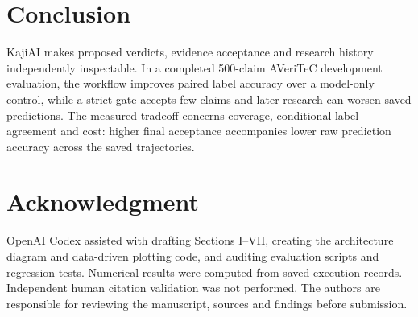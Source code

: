 \documentclass[conference]{IEEEtran}
\begin{document}
\section{Conclusion}
KajiAI makes proposed verdicts, evidence acceptance and research history independently inspectable. In a completed 500-claim AVeriTeC development evaluation, the workflow improves paired label accuracy over a model-only control, while a strict gate accepts few claims and later research can worsen saved predictions. The measured tradeoff concerns coverage, conditional label agreement and cost: higher final acceptance accompanies lower raw prediction accuracy across the saved trajectories.

\section*{Acknowledgment}
OpenAI Codex assisted with drafting Sections I--VII, creating the architecture diagram and data-driven plotting code, and auditing evaluation scripts and regression tests. Numerical results were computed from saved execution records. Independent human citation validation was not performed. The authors are responsible for reviewing the manuscript, sources and findings before submission.
\end{document}
